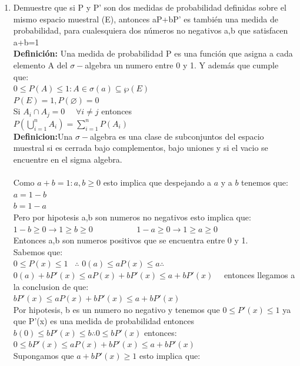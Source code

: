 \documentclass[12pt,a4paper]{report}
\begin{document}
\begin{enumerate}
   \item {
    Demuestre que si P y P' son dos medidas de probabilidad definidas sobre el mismo espacio muestral (E), antonces aP+bP' es también una medida de probabilidad, para cualesquiera dos números no negativos a,b que satisfacen a+b=1\\
    \textbf{Definición:} Una medida de probabilidad P es una función que asigna a cada elemento A del $\sigma-$algebra un numero entre 0 y 1. Y además que cumple que:\\
    $0 \leq P(A) \leq 1 : A \in \sigma(a)\subseteq \wp(E)$\\
    $P(E)=1, P(\varnothing)=0$\\
    Si $A_{i} \cap A_{j} = 0 $ \ \ $\forall i \neq j $ entonces\\
    $P(\bigcup\limits_{i=1}^{n} A_{i})= \sum_{i=1}^{n} P(A_{i})$\\
    \textbf{Definicion:}Una $\sigma-$algebra es una clase de subconjuntos del espacio muestral si es cerrada bajo complementos, bajo uniones y si el  vacio se encuentre en el sigma algebra.\\ \\
    Como $a+b=1 : a,b \geq 0$ esto implica que despejando a $a$ y a $b$ tenemos que:\\
    $a=1-b$\\
    $b=1-a$\\
    Pero por hipotesis a,b son numeros no negativos esto implica que:\\
    $1-b \geq 0 \rightarrow 1 \geq b \geq 0$ \ \ \ \ \ \ \ \ \ \           
    $1-a \geq 0 \rightarrow 1\geq a \geq 0$ \\
    Entonces a,b son numeros positivos que se encuentra entre 0 y 1. \\
    Sabemos que:\\
    $0 \leq P(x) \leq 1$ \ $\therefore$ $0(a)\leq aP(x) \leq a \therefore $ \\$ 0(a)+bP'(x)\leq aP(x)+bP'(x) \leq a+bP'(x)$ \ \ entonces llegamos a la conclusion de que:\\
    $bP'(x)\leq aP(x)+bP'(x) \leq a+bP'(x)$\\
    Por hipotesis, b es un numero no negativo y tenemos que $0\leq P'(x)\leq 1$ ya que P'(x) es una medida de probabilidad entonces $b(0)\leq bP'(x) \leq b \therefore 0\leq bP'(x)$ entonces:\\
    $0\leq bP'(x)\leq aP(x)+bP'(x)\leq a+bP'(x)$\\
    Supongamos que $a+bP'(x)\geq 1$ esto implica que:\\
}
\end{enumerate}
\end{document}
